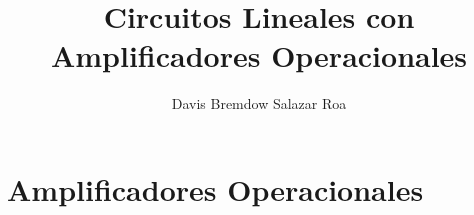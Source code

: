 \documentclass[]{article}
\title{Circuitos Lineales con Amplificadores Operacionales}
\author{Davis Bremdow Salazar Roa}
\begin{document}
\maketitle

\begin{abstract}

\end{abstract}

\maketitle
\newpage
\tableofcontents
\section{Amplificadores Operacionales}
\end{document}
